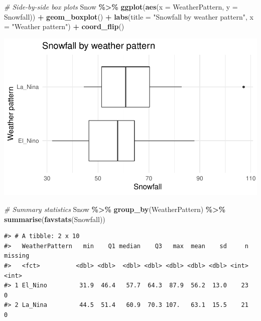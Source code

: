 \documentclass[
]{report}
\newenvironment{Shaded}{\begin{snugshade}}{\end{snugshade}}
\newcommand{\CommentTok}[1]{\textcolor[rgb]{0.56,0.35,0.01}{\textit{#1}}}
\newcommand{\DataTypeTok}[1]{\textcolor[rgb]{0.13,0.29,0.53}{#1}}
\newcommand{\KeywordTok}[1]{\textcolor[rgb]{0.13,0.29,0.53}{\textbf{#1}}}
\newcommand{\NormalTok}[1]{#1}
\newcommand{\OperatorTok}[1]{\textcolor[rgb]{0.81,0.36,0.00}{\textbf{#1}}}
\newcommand{\StringTok}[1]{\textcolor[rgb]{0.31,0.60,0.02}{#1}}
\begin{document}
\newpage

\begin{Shaded}
\begin{Highlighting}[]
\CommentTok{\# Side{-}by{-}side box plots}
\NormalTok{Snow }\OperatorTok{\%\textgreater{}\%}
\KeywordTok{ggplot}\NormalTok{(}\KeywordTok{aes}\NormalTok{(}\DataTypeTok{x =}\NormalTok{ WeatherPattern, }\DataTypeTok{y =}\NormalTok{ Snowfall)) }\OperatorTok{+}
\StringTok{    }\KeywordTok{geom\_boxplot}\NormalTok{() }\OperatorTok{+}\StringTok{ }
\StringTok{    }\KeywordTok{labs}\NormalTok{(}\DataTypeTok{title =} \StringTok{"Snowfall by weather pattern"}\NormalTok{,}
         \DataTypeTok{x =} \StringTok{"Weather pattern"}\NormalTok{) }\OperatorTok{+}
\StringTok{    }\KeywordTok{coord\_flip}\NormalTok{()}
\end{Highlighting}
\end{Shaded}

\begin{center}\includegraphics[width=0.6\linewidth]{09-inference-2quant_files/figure-latex/unnamed-chunk-2-1} \end{center}

\begin{Shaded}
\begin{Highlighting}[]
\CommentTok{\# Summary statistics}
\NormalTok{Snow }\OperatorTok{\%\textgreater{}\%}\StringTok{ }
\StringTok{    }\KeywordTok{group\_by}\NormalTok{(WeatherPattern) }\OperatorTok{\%\textgreater{}\%}
\StringTok{    }\KeywordTok{summarise}\NormalTok{(}\KeywordTok{favstats}\NormalTok{(Snowfall)) }
\end{Highlighting}
\end{Shaded}

\begin{verbatim}
#> # A tibble: 2 x 10
#>   WeatherPattern   min    Q1 median    Q3   max  mean    sd     n missing
#>   <fct>          <dbl> <dbl>  <dbl> <dbl> <dbl> <dbl> <dbl> <int>   <int>
#> 1 El_Nino         31.9  46.4   57.7  64.3  87.9  56.2  13.0    23       0
#> 2 La_Nina         44.5  51.4   60.9  70.3 107.   63.1  15.5    21       0
\end{verbatim}
\end{document}
